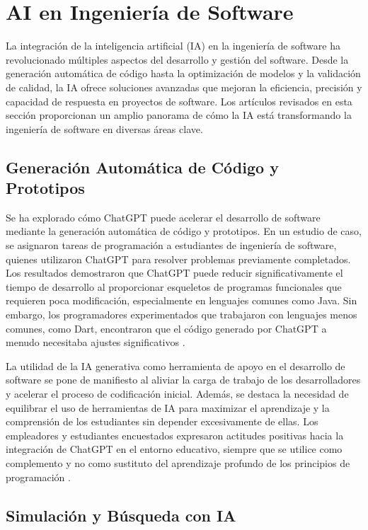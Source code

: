\section{AI en Ingeniería de Software}

La integración de la inteligencia artificial (IA) en la ingeniería de software ha revolucionado múltiples aspectos del desarrollo y gestión del software. Desde la generación automática de código hasta la optimización de modelos y la validación de calidad, la IA ofrece soluciones avanzadas que mejoran la eficiencia, precisión y capacidad de respuesta en proyectos de software. Los artículos revisados en esta sección proporcionan un amplio panorama de cómo la IA está transformando la ingeniería de software en diversas áreas clave.

\subsection{Generación Automática de Código y Prototipos}

Se ha explorado cómo ChatGPT puede acelerar el desarrollo de software mediante la generación automática de código y prototipos. En un estudio de caso, se asignaron tareas de programación a estudiantes de ingeniería de software, quienes utilizaron ChatGPT para resolver problemas previamente completados. Los resultados demostraron que ChatGPT puede reducir significativamente el tiempo de desarrollo al proporcionar esqueletos de programas funcionales que requieren poca modificación, especialmente en lenguajes comunes como Java. Sin embargo, los programadores experimentados que trabajaron con lenguajes menos comunes, como Dart, encontraron que el código generado por ChatGPT a menudo necesitaba ajustes significativos \cite{Petrovska2023}.

La utilidad de la IA generativa como herramienta de apoyo en el desarrollo de software se pone de manifiesto al aliviar la carga de trabajo de los desarrolladores y acelerar el proceso de codificación inicial. Además, se destaca la necesidad de equilibrar el uso de herramientas de IA para maximizar el aprendizaje y la comprensión de los estudiantes sin depender excesivamente de ellas. Los empleadores y estudiantes encuestados expresaron actitudes positivas hacia la integración de ChatGPT en el entorno educativo, siempre que se utilice como complemento y no como sustituto del aprendizaje profundo de los principios de programación \cite{Petrovska2023}.

\subsection{Simulación y Búsqueda con IA}

